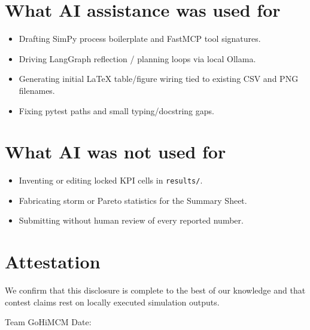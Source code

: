\documentclass[11pt]{article}
\begin{document}
\section{What AI assistance was used for}
\begin{itemize}[leftmargin=1.4em]
  \item Drafting SimPy process boilerplate and FastMCP tool signatures.
  \item Driving LangGraph reflection / planning loops via local Ollama.
  \item Generating initial LaTeX table/figure wiring tied to existing
        CSV and PNG filenames.
  \item Fixing pytest paths and small typing/docstring gaps.
\end{itemize}

\section{What AI was not used for}
\begin{itemize}[leftmargin=1.4em]
  \item Inventing or editing locked KPI cells in \texttt{results/}.
  \item Fabricating storm or Pareto statistics for the Summary Sheet.
  \item Submitting without human review of every reported number.
\end{itemize}

\section{Attestation}
We confirm that this disclosure is complete to the best of our knowledge
and that contest claims rest on locally executed simulation outputs.

\vspace{1.2em}
\noindent
Team GoHiMCM \hfill Date: \underline{\hspace{3.5cm}}
\end{document}
